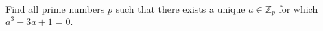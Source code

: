 Find all prime numbers $p$ such that there exists a unique $a \in \mathbb{Z}_p$ for which $a^3 - 3a + 1 = 0.$
